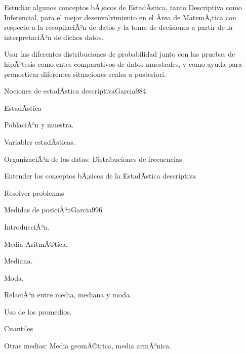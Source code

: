 \begin{syllabus}


\begin{goals}
\item  Estudiar algunos conceptos bÃ¡sicos de EstadÃ­stica, tanto Descriptiva como Inferencial, para el mejor desenvolvimiento en el Ãrea de MatemÃ¡tica con respecto a la recopilaciÃ³n de datos y la toma de decisiones a partir de la interpretaciÃ³n de dichos datos.
\item  Usar las diferentes distribuciones de probabilidad junto con las pruebas de hipÃ³tesis como entes comparativos de datos muestrales, y como ayuda para pronosticar diferentes situaciones reales a posteriori.
\end{goals}

\begin{outcomes}
\end{outcomes}

\begin{unit}{Nociones de estadÃ­stica descriptiva}{Garcia98}{4}
   \begin{topics}
         \item  EstadÃ­stica
	 \item  PoblaciÃ³n y muestra.
	 \item  Variables estadÃ­sticas.
         \item  OrganizaciÃ³n de los datos: Distribuciones de frecuencias.
   \end{topics}

   \begin{unitgoals}
         \item  Entender los conceptos bÃ¡sicos de la EstadÃ­stica descriptiva
         \item  Resolver problemas
   \end{unitgoals}
\end{unit}

\begin{unit}{Medidas de posiciÃ³n}{Garcia99}{6}
   \begin{topics}
	\item IntroducciÃ³n.
	\item Media AritmÃ©tica.
	\item Mediana.
	\item Moda.
	\item RelaciÃ³n entre media, mediana y moda.
	\item Uso de los promedios.
	\item Cuantiles
	\item Otras medias: Media geomÃ©trica, media armÃ³nica.
   \end{topics}


\end{unit}
\end{syllabus}
